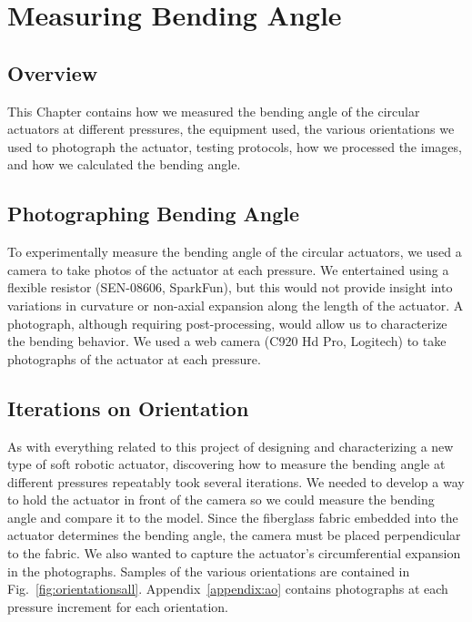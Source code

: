 \chapter{Measuring Bending Angle}
\label{chapter:measurebendingangle}

\section{Overview}
This Chapter contains how we measured the bending angle of the circular actuators at different pressures, the equipment used, the various orientations we used to photograph the actuator, testing protocols, how we processed the images, and how we calculated the bending angle.

\section{Photographing Bending Angle}

To experimentally measure the bending angle of the circular actuators, we used a camera to take photos of the actuator at each pressure. We entertained using a flexible resistor (SEN-08606, SparkFun), but this would not provide insight into variations in curvature or non-axial expansion along the length of the actuator. A photograph, although requiring post-processing, would allow us to characterize the bending behavior. We used a web camera (C920 Hd Pro, Logitech) to take photographs of the actuator at each pressure.

\section{Iterations on Orientation}

As with everything related to this project of designing and characterizing a new type of soft robotic actuator, discovering how to measure the bending angle at different pressures repeatably took several iterations. We needed to develop a way to hold the actuator in front of the camera so we could measure the bending angle and compare it to the model. Since the fiberglass fabric embedded into the actuator determines the bending angle, the camera must be placed perpendicular to the fabric. We also wanted to capture the actuator's circumferential expansion in the photographs. Samples of the various orientations are contained in Fig.~\ref{fig:orientationsall}. Appendix~\ref{appendix:ao} contains photographs at each pressure increment for each orientation. 

